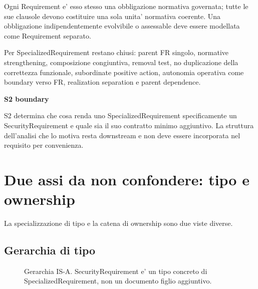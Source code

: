 \documentclass[11pt,a4paper]{article}
\newenvironment{statusbox}[1]{%
  \def\FrameCommand{\fcolorbox{ddtablue}{ddtagray}}%
  \MakeFramed{\advance\hsize-2\width\FrameRestore}
  \noindent\textbf{#1}\par\smallskip
}{\endMakeFramed}
\begin{document}
Ogni Requirement e' esso stesso una obbligazione normativa governata; tutte le sue clausole devono costituire una sola unita' normativa coerente. Una obbligazione indipendentemente evolvibile o assessable deve essere modellata come Requirement separato.

Per SpecializedRequirement restano chiusi: parent FR singolo, normative strengthening, composizione congiuntiva, removal test, no duplicazione della correttezza funzionale, subordinate positive action, autonomia operativa come boundary verso FR, realization separation e parent dependence.

\begin{statusbox}{S2 boundary}
S2 determina che cosa renda uno SpecializedRequirement specificamente un SecurityRequirement e quale sia il suo contratto minimo aggiuntivo. La struttura dell'analisi che lo motiva resta downstream e non deve essere incorporata nel requisito per convenienza.
\end{statusbox}

\section{Due assi da non confondere: tipo e ownership}

La specializzazione di tipo e la catena di ownership sono due viste diverse.

\subsection{Gerarchia di tipo}

\begin{figure}[h]
\centering
{}
\caption{Gerarchia IS-A. SecurityRequirement e' un tipo concreto di SpecializedRequirement, non un documento figlio aggiuntivo.}
\end{figure}
\end{document}
